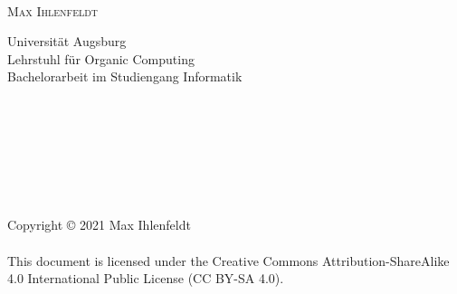\begin{verbatim}










\end{verbatim}

\begin{center}
	\huge{\textbf{\titleDocument}}
\end{center}

\begin{center}
	\Large{\textbf{\\}}
\end{center}

\vspace{.5em}
\begin{center}
	\large{\textsc{Max Ihlenfeldt}}
\end{center}

\begin{center}
	\large{
		Universität Augsburg \\
		Lehrstuhl für Organic Computing \\
		Bachelorarbeit im Studiengang Informatik
	}
\end{center}

\begin{verbatim}








\end{verbatim}

\begin{center}
	\large{
		Copyright \copyright{} 2021 Max Ihlenfeldt \\
		\phantom{} \\
		This document is licensed under the Creative Commons Attribution-ShareAlike 4.0 International Public License (CC BY-SA 4.0).
	}
\end{center}